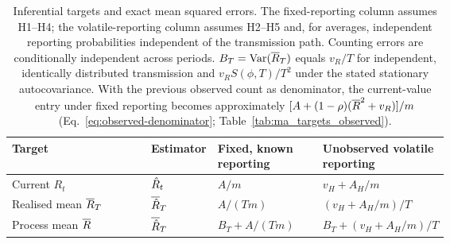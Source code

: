 \begin{table}[!tbp]
\centering
\small
\setlength{\tabcolsep}{4pt}
\caption{Inferential targets and exact mean squared errors. The fixed-reporting column assumes H1--H4; the volatile-reporting column assumes H2--H5 and, for averages, independent reporting probabilities independent of the transmission path. Counting errors are conditionally independent across periods. $B_T=\operatorname{Var}(\overline{R}_T)$ equals $v_R/T$ for independent, identically distributed transmission and $v_RS(\phi,T)/T^2$ under the stated stationary autocovariance. With the previous observed count as denominator, the current-value entry under fixed reporting becomes approximately $[A+(1-\rho)(\overline{R}^2+v_R)]/m$ (Eq.~\ref{eq:observed-denominator}; Table~\ref{tab:ma_targets_observed}).}
\label{tab:targets}
\begin{tabularx}{\linewidth}{>{\raggedright\arraybackslash}X>{\centering\arraybackslash}p{0.13\linewidth}>{\centering\arraybackslash}p{0.24\linewidth}>{\centering\arraybackslash}p{0.27\linewidth}}
\toprule
Target & Estimator & Fixed, known reporting & Unobserved volatile reporting \\
\midrule
Current $R_t$ & $\hat R_t$ & $A/m$ & $v_H+A_H/m$ \\
Realised mean $\overline{R}_T$ & $\overline{\hat R}_T$ & $A/(Tm)$ & $(v_H+A_H/m)/T$ \\
Process mean $\overline{R}$ & $\overline{\hat R}_T$ & $B_T+A/(Tm)$ & $B_T+(v_H+A_H/m)/T$ \\
\bottomrule
\end{tabularx}
\end{table}
